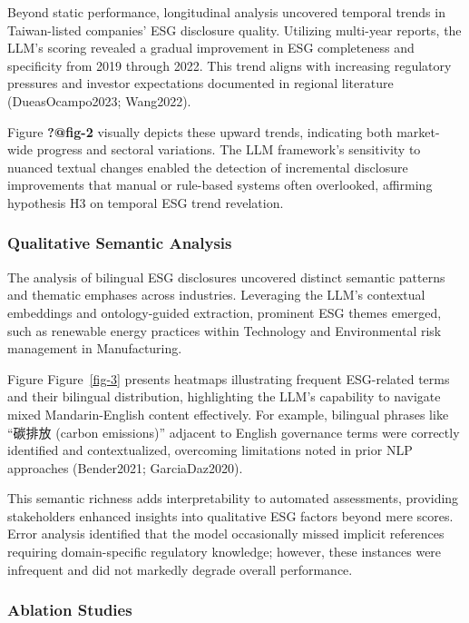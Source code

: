 \documentclass[
  12pt,
]{article}
\begin{document}
Beyond static performance, longitudinal analysis uncovered temporal
trends in Taiwan-listed companies' ESG disclosure quality. Utilizing
multi-year reports, the LLM's scoring revealed a gradual improvement in
ESG completeness and specificity from 2019 through 2022. This trend
aligns with increasing regulatory pressures and investor expectations
documented in regional literature (DueasOcampo2023; Wang2022).

Figure \textbf{?@fig-2} visually depicts these upward trends, indicating
both market-wide progress and sectoral variations. The LLM framework's
sensitivity to nuanced textual changes enabled the detection of
incremental disclosure improvements that manual or rule-based systems
often overlooked, affirming hypothesis H3 on temporal ESG trend
revelation.

\subsubsection{Qualitative Semantic
Analysis}\label{qualitative-semantic-analysis}

The analysis of bilingual ESG disclosures uncovered distinct semantic
patterns and thematic emphases across industries. Leveraging the LLM's
contextual embeddings and ontology-guided extraction, prominent ESG
themes emerged, such as renewable energy practices within Technology and
Environmental risk management in Manufacturing.

Figure Figure~\ref{fig-3} presents heatmaps illustrating frequent
ESG-related terms and their bilingual distribution, highlighting the
LLM's capability to navigate mixed Mandarin-English content effectively.
For example, bilingual phrases like ``碳排放 (carbon emissions)''
adjacent to English governance terms were correctly identified and
contextualized, overcoming limitations noted in prior NLP approaches
(Bender2021; GarciaDaz2020).

This semantic richness adds interpretability to automated assessments,
providing stakeholders enhanced insights into qualitative ESG factors
beyond mere scores. Error analysis identified that the model
occasionally missed implicit references requiring domain-specific
regulatory knowledge; however, these instances were infrequent and did
not markedly degrade overall performance.

\subsubsection{Ablation Studies}\label{ablation-studies}
\end{document}
